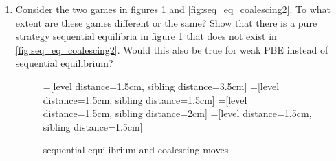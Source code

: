 \documentclass[a4paper,12pt]{article}
\begin{document}
\begin{enumerate}
\item Consider the two games in figures \ref{fig:seq_eq_coalescing} and \ref{fig:seq_eq_coalescing2}. To what extent are these games different or the same? Show that there is a pure strategy sequential equilibria in figure \ref{fig:seq_eq_coalescing} that does not exist in \ref{fig:seq_eq_coalescing2}. Would this also be true for  weak PBE instead of sequential equilibrium?
  
   \begin{figure}[h]
\centering
=[level distance=1.5cm, sibling distance=3.5cm]
=[level distance=1.5cm, sibling distance=1.5cm]
=[level distance=1.5cm, sibling distance=2cm]
=[level distance=1.5cm, sibling distance=1.5cm]
\caption{sequential equilibrium and coalescing moves}
\label{fig:seq_eq_coalescing}
\end{figure}


\end{enumerate}
\end{document}
